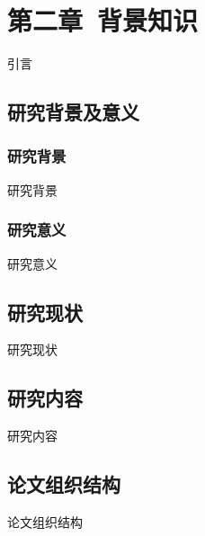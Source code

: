\setcounter{section}{2}
\setcounter{subsection}{0}
\section*{第二章\ 背景知识}
引言
\subsection{研究背景及意义}
\subsubsection{研究背景}
研究背景
\subsubsection{研究意义}
研究意义
\subsection{研究现状}
研究现状
\subsection{研究内容}
研究内容
\subsection{论文组织结构}
论文组织结构

\pagestyle{fancy}			%
\chead{}	%

